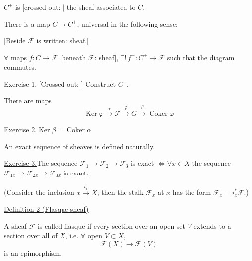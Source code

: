 $C^+$ is [crossed out: ]
the sheaf associated to $C$.


There is a map
$C\longrightarrow C^+$,
universal in the following sense:

\begin{center}
\end{center}
[Beside $\mathcal F$ is written: sheaf.]

$\forall$ maps $f\colon C\longrightarrow\mathcal F$
[beneath $\mathcal F$: sheaf],
$\exists!\ f^+\colon C^+\longrightarrow\mathcal F$ such that the diagram commutes.

\underline{Exercise 1.}
[Crossed out: ]
Construct $C^+$.

There are maps
\begin{equation*}
\operatorname{Ker}\varphi\overset{\alpha}{\longrightarrow}\mathcal F
\overset{\varphi}{\longrightarrow}G
\overset{\beta}{\longrightarrow}\operatorname{Coker}\varphi
\end{equation*}

\underline{Exercise 2.}\quad $\operatorname{Ker}\beta=\operatorname{Coker}\alpha$

An exact sequence of sheaves is defined naturally.

\underline{Exercise 3.}\quad The sequence $\mathcal F_1\longrightarrow\mathcal F_2\longrightarrow\mathcal F_3$
is exact $\Longleftrightarrow\forall x\in X$
the sequence $\mathcal F_{1x}\longrightarrow\mathcal F_{2x}\longrightarrow\mathcal F_{3x}$ is exact.

(Consider the inclusion $x\overset{i_x}{\longrightarrow}X$; then the stalk $\mathcal F_x$ at $x$
has the form $\mathcal F_x=i_x^*\mathcal F$.)

\underline{Definition 2 (Flasque sheaf)}

A sheaf $\mathcal F$ is called flasque if every section over an open set $V$ extends
to a section over all of $X$, i.e. $\forall$ open $V\subset X$,
\begin{equation*}
\mathcal F(X)\longrightarrow\mathcal F(V)
\end{equation*}
is an epimorphism.

